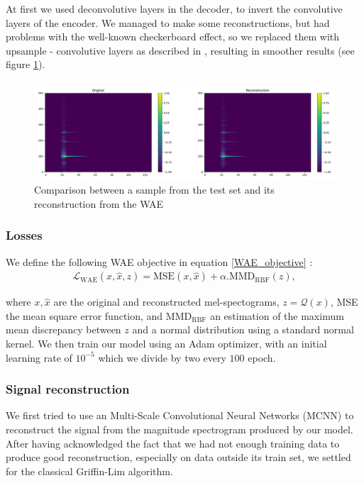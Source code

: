 \documentclass[11pt, english]{article}
\begin{document}
At first we used deconvolutive layers in the decoder, to invert the convolutive layers of the encoder. We managed to make some reconstructions, but had problems with the well-known checkerboard effect, so we replaced them with upsample - convolutive layers as described in \cite{odena2016deconvolution}, resulting in smoother results (see figure \ref{fig:comparison_sample_reconstruction}).

\begin{figure}
    \centering
    \includegraphics[width=\linewidth]{img/compa_finale_specto.png}
    \caption{Comparison between a sample from the test set and its reconstruction from the WAE}
    \label{fig:comparison_sample_reconstruction}
\end{figure}

\subsubsection*{Losses}

We define the following WAE objective in equation \eqref{WAE_objective} : 
\begin{align}
\mathcal L_{\text{WAE}}(x, \hat x, z) = \text{MSE}(x,\hat x) + \alpha . \text{MMD}_\text{RBF}(z),
\label{WAE_objective}
\end{align}

where $x, \hat x$ are the original and reconstructed mel-spectograms, $z = \mathcal Q(x)$, MSE the mean square error function, and $\text{MMD}_\text{RBF}$ an estimation of the maximum mean discrepancy between $z$ and a normal distribution using a standard normal kernel. We then train our model using an Adam optimizer, with an initial learning rate of $10^{-5}$ which we divide by two every $100$ epoch.

\subsubsection*{Signal reconstruction}
We first tried to use an Multi-Scale Convolutional Neural Networks (MCNN) to reconstruct the signal from the magnitude spectrogram produced by our model. After having acknowledged the fact that we had not enough training data to produce good reconstruction, especially on data outside its train set, we settled for the classical Griffin-Lim algorithm\cite{griffin_lim}. 
\end{document}

